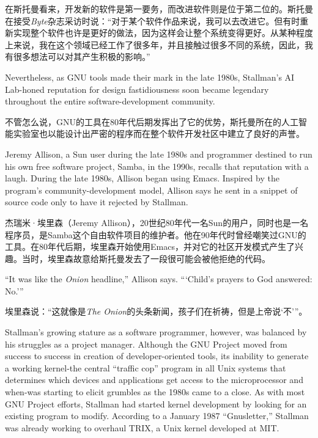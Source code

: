 \ifdefined\chs
在斯托曼看来，开发新的软件是第一要务，而改进软件则是位于第二位的。斯托曼在接受\textit{Byte}杂志采访时说：``对于某个软件作品来说，我可以去改进它。但有时重新实现整个软件也许是更好的做法，因为这样会让整个系统变得更好。从某种程度上来说，我在这个领域已经工作了很多年，并且接触过很多不同的系统，因此，我有很多想法可以对其产生积极的影响。''
\fi

\ifdefined\eng
Nevertheless, as GNU tools made their mark in the late 1980s, Stallman's AI Lab-honed reputation for design fastidiousness soon became legendary throughout the entire software-development community.
\fi

\ifdefined\chs
不管怎么说，GNU的工具在80年代后期发挥出了它的优势，斯托曼所在的人工智能实验室也以能设计出严密的程序而在整个软件开发社区中建立了良好的声誉。
\fi

\ifdefined\eng
Jeremy Allison, a Sun user during the late 1980s and programmer destined to run his own free software project, Samba, in the 1990s, recalls that reputation with a laugh. During the late 1980s, Allison began using Emacs. Inspired by the program's community-development model, Allison says he sent in a snippet of source code only to have it rejected by Stallman.
\fi

\ifdefined\chs
杰瑞米·埃里森（Jeremy Allison），20世纪80年代一名Sun的用户，同时也是一名程序员，是Samba这个自由软件项目的维护者。他在90年代时曾经嘲笑过GNU的工具。在80年代后期，埃里森开始使用Emacs，并对它的社区开发模式产生了兴趣。当时，埃里森故意给斯托曼发去了一段很可能会被他拒绝的代码。
\fi

\ifdefined\eng
``It was like the \textit{Onion} headline,'' Allison says. ``\hspace{0.01in}`Child's prayers to God answered: No.'\hspace{0.01in}''
\fi

\ifdefined\chs
埃里森说：``这就像是\textit{The Onion}的头条新闻，孩子们在祈祷，但是上帝说`不'\hspace{0.01in}''。
\fi

\ifdefined\eng
Stallman's growing stature as a software programmer, however, was balanced by his struggles as a project manager. Although the GNU Project moved from success to success in creation of developer-oriented tools, its inability to generate a working kernel-the central ``traffic cop'' program in all Unix systems that determines which devices and applications get access to the microprocessor and when-was starting to elicit grumbles as the 1980s came to a close. As with most GNU Project efforts, Stallman had started kernel development by looking for an existing program to modify. According to a January 1987 ``Gnusletter,'' Stallman was already working to overhaul TRIX, a Unix kernel developed at MIT.
\fi

